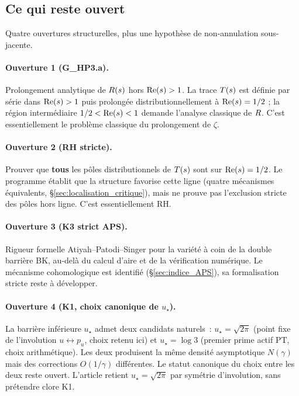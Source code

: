 \subsection{Ce qui reste ouvert}
\label{sec:ouvertures}

Quatre ouvertures structurelles, plus une hypothèse de non-annulation
sous-jacente.

\paragraph{Ouverture 1 (G\_HP3.a).}
Prolongement analytique de $R(s)$ hors $\operatorname{Re}(s) > 1$. La trace
$T(s)$ est définie par série dans $\operatorname{Re}(s) > 1$ puis prolongée
distributionnellement à $\operatorname{Re}(s) = 1/2$ ; la région intermédiaire
$1/2 < \operatorname{Re}(s) < 1$ demande l'analyse classique de $R$. C'est
essentiellement le problème classique du prolongement de $\zeta$.

\paragraph{Ouverture 2 (RH stricte).}
Prouver que \textbf{tous} les pôles distributionnels de $T(s)$ sont
sur $\operatorname{Re}(s) = 1/2$. Le programme établit que la structure favorise
cette ligne (quatre mécanismes équivalents,
\S\ref{sec:localisation_critique}), mais ne prouve pas l'exclusion
stricte des pôles hors ligne. C'est essentiellement RH.

\paragraph{Ouverture 3 (K3 strict APS).}
Rigueur formelle Atiyah--Patodi--Singer pour la variété à coin de la
double barrière BK, au-delà du calcul d'aire et de la vérification
numérique. Le mécanisme cohomologique est identifié
(\S\ref{sec:indice_APS}), sa formalisation stricte reste à développer.

\paragraph{Ouverture 4 (K1, choix canonique de $u_\star$).}
La barrière inférieure $u_\star$ admet deux candidats naturels~:
$u_\star = \sqrt{2\pi}$ (point fixe de l'involution
$u \leftrightarrow p_u$, choix retenu ici) et $u_\star = \log 3$
(premier prime actif PT, choix arithmétique). Les deux produisent la
même densité asymptotique $N(\gamma)$ mais des corrections
$O(1/\gamma)$ différentes. Le statut canonique du choix entre les deux
reste ouvert. L'article retient $u_\star = \sqrt{2\pi}$ par symétrie
d'involution, sans prétendre clore K1.

